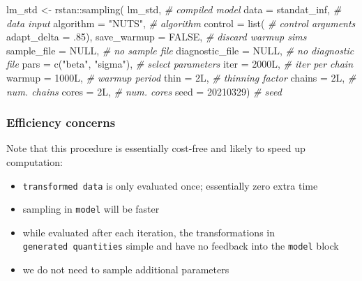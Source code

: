 \documentclass[
  11pt,
]{article}
\newenvironment{Shaded}{\begin{snugshade}}{\end{snugshade}}
\newcommand{\AttributeTok}[1]{\textcolor[rgb]{0.77,0.63,0.00}{#1}}
\newcommand{\CommentTok}[1]{\textcolor[rgb]{0.56,0.35,0.01}{\textit{#1}}}
\newcommand{\ConstantTok}[1]{\textcolor[rgb]{0.00,0.00,0.00}{#1}}
\newcommand{\DecValTok}[1]{\textcolor[rgb]{0.00,0.00,0.81}{#1}}
\newcommand{\FunctionTok}[1]{\textcolor[rgb]{0.00,0.00,0.00}{#1}}
\newcommand{\NormalTok}[1]{#1}
\newcommand{\OtherTok}[1]{\textcolor[rgb]{0.56,0.35,0.01}{#1}}
\newcommand{\SpecialCharTok}[1]{\textcolor[rgb]{0.00,0.00,0.00}{#1}}
\newcommand{\StringTok}[1]{\textcolor[rgb]{0.31,0.60,0.02}{#1}}
\providecommand{\tightlist}{%
  \setlength{\itemsep}{0pt}\setlength{\parskip}{0pt}}
\begin{document}
\begin{Shaded}
\begin{Highlighting}[]
\NormalTok{lm\_std }\OtherTok{\textless{}{-}}\NormalTok{ rstan}\SpecialCharTok{::}\FunctionTok{sampling}\NormalTok{(}
\NormalTok{  lm\_std,                     }\CommentTok{\# compiled model}
  \AttributeTok{data =}\NormalTok{ standat\_inf,         }\CommentTok{\# data input}
  \AttributeTok{algorithm =} \StringTok{"NUTS"}\NormalTok{,         }\CommentTok{\# algorithm}
  \AttributeTok{control =} \FunctionTok{list}\NormalTok{(             }\CommentTok{\# control arguments}
    \AttributeTok{adapt\_delta =}\NormalTok{ .}\DecValTok{85}\NormalTok{),}
  \AttributeTok{save\_warmup =} \ConstantTok{FALSE}\NormalTok{,        }\CommentTok{\# discard warmup sims}
  \AttributeTok{sample\_file =} \ConstantTok{NULL}\NormalTok{,         }\CommentTok{\# no sample file}
  \AttributeTok{diagnostic\_file =} \ConstantTok{NULL}\NormalTok{,     }\CommentTok{\# no diagnostic file}
  \AttributeTok{pars =} \FunctionTok{c}\NormalTok{(}\StringTok{"beta"}\NormalTok{, }\StringTok{"sigma"}\NormalTok{),  }\CommentTok{\# select parameters}
  \AttributeTok{iter =}\NormalTok{ 2000L,               }\CommentTok{\# iter per chain}
  \AttributeTok{warmup =}\NormalTok{ 1000L,             }\CommentTok{\# warmup period}
  \AttributeTok{thin =}\NormalTok{ 2L,                  }\CommentTok{\# thinning factor}
  \AttributeTok{chains =}\NormalTok{ 2L,                }\CommentTok{\# num. chains}
  \AttributeTok{cores =}\NormalTok{ 2L,                 }\CommentTok{\# num. cores}
  \AttributeTok{seed =} \DecValTok{20210329}\NormalTok{)            }\CommentTok{\# seed}
\end{Highlighting}
\end{Shaded}

\hypertarget{efficiency-concerns}{%
\subsubsection{Efficiency concerns}\label{efficiency-concerns}}

Note that this procedure is essentially cost-free and likely to speed up computation:

\begin{itemize}
\tightlist
\item
  \texttt{transformed\ data} is only evaluated once; essentially zero extra time
\item
  sampling in \texttt{model} will be faster
\item
  while evaluated after each iteration, the transformations in \texttt{generated\ quantities} simple and have no feedback into the \texttt{model} block
\item
  we do not need to sample additional parameters
\end{itemize}
\end{document}
